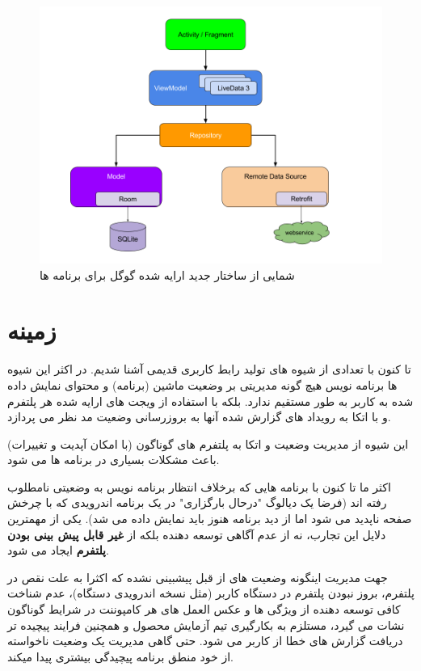 \documentclass{CSICC2020}
\begin{document}
\begin{figure}[h]
\includegraphics[width=\linewidth]{Images/android-arch}
\caption{شمایی از ساختار جدید ارایه شده گوگل برای برنامه ها}
\label{fig:AndroidArch}
\end{figure}

\section{زمینه}
\label{Context}
تا کنون با تعدادی از شیوه های تولید رابط کاربری قدیمی آشنا شدیم. در اکثر این شیوه ها برنامه نویس هیچ گونه مدیریتی بر وضعیت ماشین (برنامه) و محتوای نمایش داده شده به کاربر به طور مستقیم ندارد. بلکه با استفاده از ویجت های ارایه شده هر پلتفرم و با اتکا به رویداد های گزارش شده آنها به بروزرسانی وضعیت مد نظر می پردازد.

این شیوه از مدیریت وضعیت و اتکا به پلتفرم های گوناگون (با امکان آپدیت و تغییرات) باعث مشکلات بسیاری در برنامه ها می شود.


اکثر ما تا کنون با برنامه هایی که برخلاف انتظار برنامه نویس به وضعیتی نامطلوب رفته اند (فرضا یک دیالوگ "درحال بارگزاری" در یک برنامه اندرویدی که با چرخش صفحه ناپدید می شود اما از دید برنامه هنوز باید نمایش داده می شد). یکی از مهمترین دلایل این تجارب، نه از عدم آگاهی توسعه دهنده بلکه از {\bf غیر قابل پیش بینی بودن پلتفرم} ایجاد می شود.

جهت مدیریت اینگونه وضعیت های از قبل پیشبینی نشده که اکثرا به علت نقص در پلتفرم، بروز نبودن پلتفرم در دستگاه کاربر (مثل نسخه اندرویدی دستگاه)، عدم شناخت کافی توسعه دهنده از ویژگی ها و عکس العمل های هر کامپوننت در شرایط گوناگون نشات می گیرد، مستلزم به بکارگیری تیم آزمایش محصول و همچنین فرایند پیچیده تر دریافت گزارش های خطا از کاربر می شود. 
حتی گاهی مدیریت یک وضعیت ناخواسته از خود منطق برنامه پیچیدگی بیشتری پیدا میکند.
\end{document}
